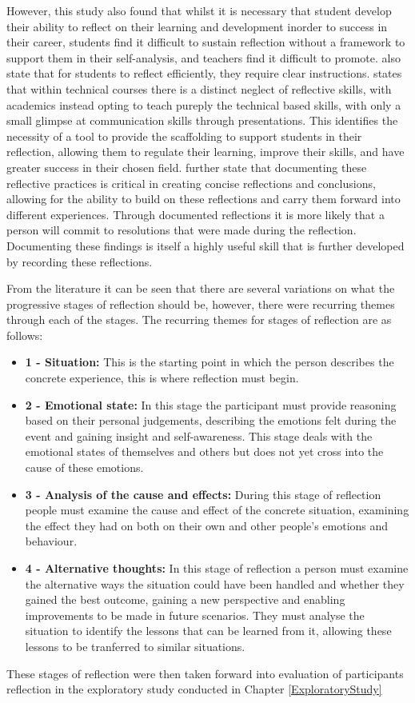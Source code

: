 \documentclass{l4proj}
\begin{document}
However, this study also found that whilst it is necessary that student develop their ability to reflect on their learning and development inorder to success in their career, students find it difficult to sustain reflection without a framework to support them in their self-analysis, and teachers find it difficult to promote. \citet{bruno_reflective_2018} also state that for students to reflect efficiently, they require clear instructions. \citet{thurner_development_2020} states that within technical courses there is a distinct neglect of reflective skills, with academics instead opting to teach pureply the technical based skills, with only a small glimpse at communication skills through presentations. This identifies the necessity of a tool to provide the scaffolding to support students in their reflection, allowing them to regulate their learning, improve their skills, and have greater success in their chosen field. \citet{thurner_development_2020} further state that documenting these reflective practices is critical in creating concise reflections and conclusions, allowing for the ability to build on these reflections and carry them forward into different experiences. Through documented reflections it is more likely that a person will commit to resolutions that were made during the reflection. Documenting these findings is itself a highly useful skill that is further developed by recording these reflections.

From the literature it can be seen that there are several variations on what the progressive stages of reflection should be, however, there were recurring themes through each of the stages. The recurring themes for stages of reflection are as follows:
\begin{itemize}
    \item \textbf{1 - Situation:} This is the starting point in which the person describes the concrete experience, this is where reflection must begin.
    \item \textbf{2 - Emotional state:} In this stage the participant must provide reasoning based on their personal judgements, describing the emotions felt during the event and gaining insight and self-awareness. This stage deals with the emotional states of themselves and others but does not yet cross into the cause of these emotions.
    \item \textbf{3 - Analysis of the cause and effects:} During this stage of reflection people must examine the cause and effect of the concrete situation, examining the effect they had on both on their own and other people's emotions and behaviour.
    \item \textbf{4 - Alternative thoughts:} In this stage of reflection a person must examine the alternative ways the situation could have been handled and whether they gained the best outcome, gaining a new perspective and enabling improvements to be made in future scenarios. They must analyse the situation to identify the lessons that can be learned from it, allowing these lessons to be tranferred to similar situations.
\end{itemize}
These stages of reflection were then taken forward into evaluation of participants reflection in the exploratory study conducted in Chapter \ref{ExploratoryStudy}
\end{document}
